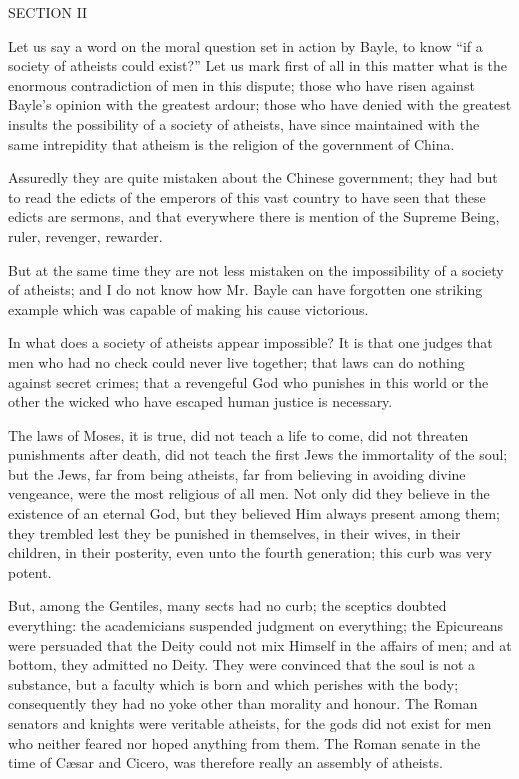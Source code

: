 SECTION II

Let us say a word on the moral question set in action by Bayle, to know
\enquote{if a society of atheists could exist?} Let us mark first of all in this
matter what is the enormous contradiction of men in this dispute; those
who have risen against Bayle's opinion with the greatest ardour; those
who have denied with the greatest insults the possibility of a society
of atheists, have since maintained with the same intrepidity that
atheism is the religion of the government of China.

Assuredly they are quite mistaken about the Chinese government; they had
but to read the edicts of the emperors of this vast country to have
seen that these edicts are sermons, and that everywhere there is mention
of the Supreme Being, ruler, revenger, rewarder.

But at the same time they are not less mistaken on the impossibility of
a society of atheists; and I do not know how Mr. Bayle can have
forgotten one striking example which was capable of making his cause
victorious.

In what does a society of atheists appear impossible? It is that one
judges that men who had no check could never live together; that laws
can do nothing against secret crimes; that a revengeful God who punishes
in this world or the other the wicked who have escaped human justice is
necessary.

The laws of Moses, it is true, did not teach a life to come, did not
threaten punishments after death, did not teach the first Jews the
immortality of the soul; but the Jews, far from being atheists, far from
believing in avoiding divine vengeance, were the most religious of all
men. Not only did they believe in the existence of an eternal God, but
they believed Him always present among them; they trembled lest they be
punished in themselves, in their wives, in their children, in their
posterity, even unto the fourth generation; this curb was very potent.

But, among the Gentiles, many sects had no curb; the sceptics doubted
everything: the academicians suspended judgment on everything; the
Epicureans were persuaded that the Deity could not mix Himself in the
affairs of men; and at bottom, they admitted no Deity. They were
convinced that the soul is not a substance, but a faculty which is born
and which perishes with the body; consequently they had no yoke other
than morality and honour. The Roman senators and knights were veritable
atheists, for the gods did not exist for men who neither feared nor
hoped anything from them. The Roman senate in the time of Cæsar and
Cicero, was therefore really an assembly of atheists.

